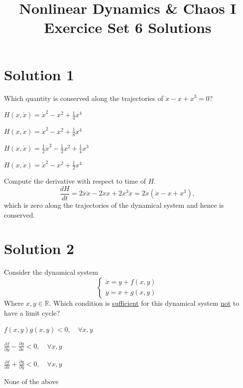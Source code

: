 \documentclass[twoside,10pt,a4paper]{article}
\title{\huge \textbf{Nonlinear Dynamics \& Chaos I \\ \Large Exercice Set 6 Solutions}}	%
\author{ }		%
\date{ }	%
\begin{document}
\maketitle

\section*{Solution 1}
Which quantity is conserved along the trajectories of $\ddot{x} - x + x^3 = 0$?

\begin{enumerate}[label=(\alph*)]
	\item $ \displaystyle  H(x, \dot{x}) = \dot{x}^2 - x^2 + \frac{1}{4}x^4 $
	\item $ \displaystyle  H(x, \dot{x}) = \dot{x}^2 - x^2 + \frac{1}{8}x^4 $
	\item $ \displaystyle  H(x, \dot{x}) = \frac{1}{2}\dot{x}^2 - \frac{1}{2}x^2 + \frac{1}{4}x^3 $
	{\color{MyRed}\item $ \displaystyle  H(x, \dot{x}) = \dot{x}^2 - x^2 + \frac{1}{2}x^4 $}
\end{enumerate}

{\color{MyRed} Compute the derivative with respect to time of $H$.
	\begin{equation*}
		\frac{dH}{dt} = 2 \ddot{x}\dot{x} - 2\dot{x}x + 2x^3 \dot{x} = 2 \dot{x} (\ddot{x} - x + x^3),
	\end{equation*}
	which is zero along the trajectories of the dynamical system and hence is conserved.}

\section*{Solution 2}
Consider the dynamical system
\begin{equation*}
	\begin{cases}
		\dot{x} = y + f(x,y) \\
		\dot{y} = x + g(x,y)
	\end{cases}
\end{equation*}
Where $x,y \in \mathbb{R}$. Which condition is \underline{sufficient} for this dynamical system \underline{not} to have a limit cycle?

\begin{enumerate}[label=(\alph*)]
	\item $ \displaystyle f(x,y)g(x,y) < 0, \quad \forall x,y $
	\item $ \displaystyle \frac{\partial f}{\partial y} - \frac{\partial g}{\partial x} < 0, \quad \forall x,y $
	{\color{MyRed}\item $ \displaystyle \frac{\partial f}{\partial x} + \frac{\partial g}{\partial y} < 0, \quad \forall x,y $}
	\item None of the above
\end{enumerate}
\end{document}
